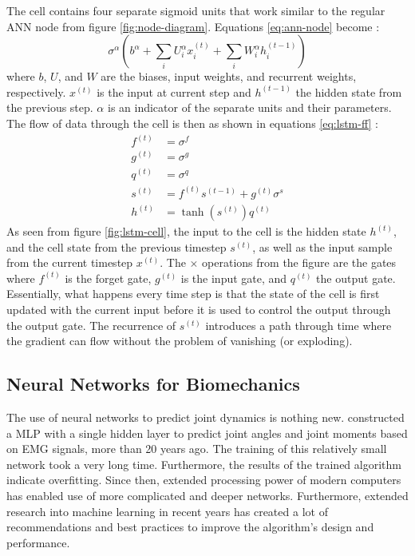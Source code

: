 \documentclass[../main.tex]{subfiles}
\begin{document}
The cell contains four separate sigmoid units that work similar to the regular \ac{ANN} node from figure \ref{fig:node-diagram}.
Equations \ref{eq:ann-node} become \cite{Goodfellow2016}:
\begin{equation}
\label{eq:lstm_sigmoid_generic}
    \sigma^{\alpha}\left(b^{\alpha} + \sum_i{U_i^{\alpha} x_i^{(t)}} + \sum_i{W_i^{\alpha} h_i^{(t-1)}} \right)
\end{equation}
where $b$, $U$, and $W$ are the biases, input weights, and recurrent weights, respectively.
$x^{(t)}$ is the input at current step and $h^{(t-1)}$ the hidden state from the previous step.
$\alpha$ is an indicator of the separate units and their parameters.
The flow of data through the cell is then as shown in equations \ref{eq:lstm-ff} \cite{Goodfellow2016}:
\begin{subequations}
\label{eq:lstm-ff}
\begin{align}
    f^{(t)} &= \sigma^f\\
    g^{(t)} &= \sigma^g\\
    q^{(t)} &= \sigma^q\\
    s^{(t)} &= f^{(t)}s^{(t-1)} + g^{(t)}\sigma^s\\
    h^{(t)} &= \tanh\left(s^{(t)}\right)q^{(t)} \label{eq:last_lstm_step}
\end{align}
\end{subequations}
As seen from figure \ref{fig:lstm-cell}, the input to the cell is the hidden state $h^{(t)}$, and the cell state from the previous timestep $s^{(t)}$, as well as the input sample from the current timestep $x^{(t)}$.
The $\times$ operations from the figure are the gates where $f^{(t)}$ is the forget gate, $g^{(t)}$ is the input gate, and $q^{(t)}$ the output gate.
Essentially, what happens every time step is that the state of the cell is first updated with the current input before it is used to control the output through the output gate.
The recurrence of $s^{(t)}$ introduces a path through time where the gradient can flow without the problem of vanishing (or exploding).




\subsection{Neural Networks for Biomechanics}
The use of neural networks to predict joint dynamics is nothing new.
\textcite{Sepulveda1993} constructed a \ac{MLP} with a single hidden layer to predict joint angles and joint moments based on EMG signals, more than 20 years ago. 
The training of this relatively small network took a very long time.
Furthermore, the results of the trained algorithm indicate overfitting.
Since then, extended processing power of modern computers has enabled use of more complicated and deeper networks.
Furthermore, extended research into machine learning in recent years has created a lot of recommendations and best practices to improve the algorithm's design and performance.
\end{document}
